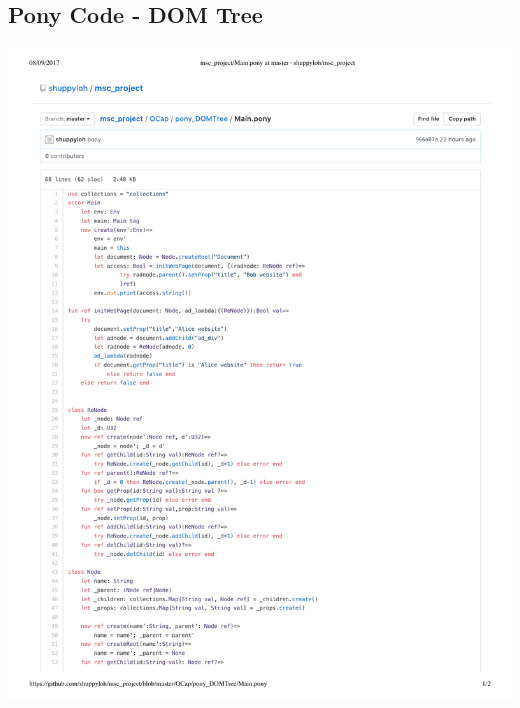 \documentclass[a4paper,11pt,twoside]{article}
\begin{document}
{\subsection{Pony Code - DOM Tree}\label{sec:code_DOM}
\begin{minipage}{\textwidth}
\includegraphics[width=\textwidth,valign=t,page=1]{figures/code_DOM.pdf}
\end{minipage}\clearpage
\begin{minipage}{\textwidth}

\end{minipage}}
\end{document}
